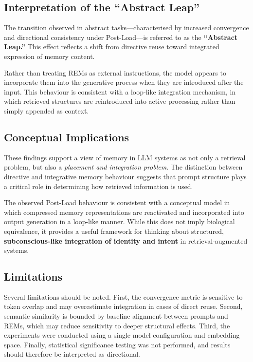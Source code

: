 \documentclass[11pt]{article}
\begin{document}
\subsection{Interpretation of the ``Abstract Leap''}

The transition observed in abstract tasks—characterised by increased convergence and directional consistency under Post-Load—is referred to as the \textbf{``Abstract Leap.''} This effect reflects a shift from directive reuse toward integrated expression of memory content.

Rather than treating REMs as external instructions, the model appears to incorporate them into the generative process when they are introduced after the input. This behaviour is consistent with a loop-like integration mechanism, in which retrieved structures are reintroduced into active processing rather than simply appended as context.

\subsection{Conceptual Implications}

These findings support a view of memory in LLM systems as not only a retrieval problem, but also a \textit{placement and integration problem}. The distinction between directive and integrative memory behaviour suggests that prompt structure plays a critical role in determining how retrieved information is used.

The observed Post-Load behaviour is consistent with a conceptual model in which compressed memory representations are reactivated and incorporated into output generation in a loop-like manner. While this does not imply biological equivalence, it provides a useful framework for thinking about structured, \textbf{subconscious-like integration of identity and intent} in retrieval-augmented systems.

\subsection{Limitations}

Several limitations should be noted. First, the convergence metric is sensitive to token overlap and may overestimate integration in cases of direct reuse. Second, semantic similarity is bounded by baseline alignment between prompts and REMs, which may reduce sensitivity to deeper structural effects. Third, the experiments were conducted using a single model configuration and embedding space. Finally, statistical significance testing was not performed, and results should therefore be interpreted as directional.
\end{document}
